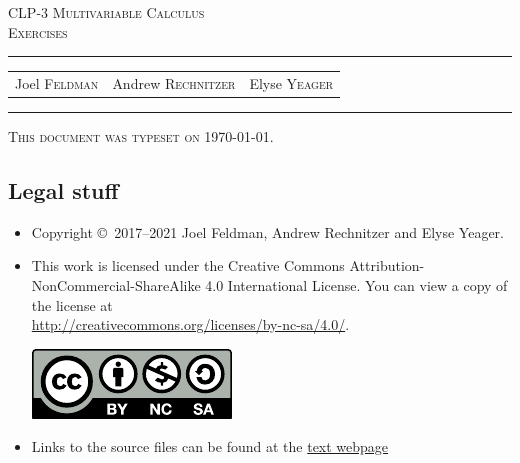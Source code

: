 \documentclass[12pt,letterpaper, openany]{book}
\makeatletter
\newcommand{\reqnomode}{\tagsleft@false}
\makeatother
\begin{document}
\reqnomode

\setcounter{page}{0}

\begin{titlepage}
\begin{center}
\textsc{\LARGE
CLP-3 Multivariable Calculus\\[2ex]
Exercises
}\\[2ex]

\vspace{5ex}
\hrule
\vspace{5ex}

\begin{tabular}{ccc}
\large  Joel \textsc{Feldman}
& \large \qquad Andrew \textsc{Rechnitzer}
&\large  \qquad Elyse \textsc{Yeager}
\end{tabular}

\end{center}
\vspace{2ex}
\hrule

\vfill
\textsc{This document was typeset on \today.}
\end{titlepage}

\subsection*{Legal stuff}
\begin{itemize}
 \item Copyright \copyright\ 2017--2021 Joel Feldman, Andrew Rechnitzer and Elyse Yeager.
\item This work is licensed under the
Creative Commons Attribution-NonCommercial-ShareAlike 4.0 International
License. You can view a copy of the license at \\
\url{http://creativecommons.org/licenses/by-nc-sa/4.0/}.
\begin{center}
 \includegraphics{by-nc-sa.pdf}
\end{center}
\item Links to the source files can be found at the \href{http://www.math.ubc.ca/~CLP/index.html}{text webpage}
\end{itemize}
\newpage
\end{document}

